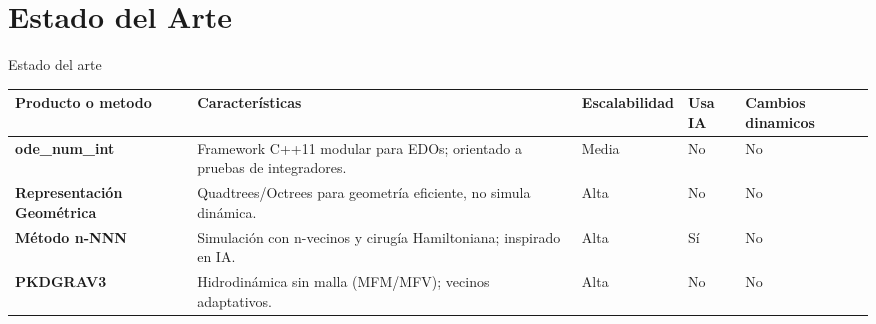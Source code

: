 \section{Estado del Arte}

\begin{frame}{Estado del arte}
    \centering
    \label{tab:arte}
    \vspace{-0.1cm}
    \begin{adjustbox}{max width=0.9\textwidth,max height=0.7\textheight, keepaspectratio}
        \renewcommand{\arraystretch}{1.3}
            \begin{tabular}{@{}>{\bfseries}p{} p{} p{} p{} p{}@{}}
            \toprule
            \textbf{Producto o metodo} & \textbf{Características} & \textbf{Escalabilidad} & \textbf{Usa IA} & \textbf{Cambios dinamicos} \\
            \midrule
            ode\_num\_int & Framework C++11 modular para EDOs; orientado a pruebas de integradores. & Media & No & No \\
            Representación Geométrica & Quadtrees/Octrees para geometría eficiente, no simula dinámica. & Alta & No & No \\
            Método n-NNN & Simulación con n-vecinos y cirugía Hamiltoniana; inspirado en IA.\ & Alta & Sí & No \\
            PKDGRAV3 & Hidrodinámica sin malla (MFM/MFV); vecinos adaptativos. & Alta & No & No \\
            \bottomrule
            \end{tabular}
    \end{adjustbox}
    \smallskip
\end{frame}



